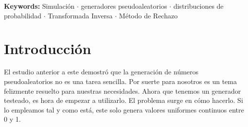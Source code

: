 \documentclass[a4paper, 11pt]{article}
\begin{document}
\newpage
\thispagestyle{empty}
\tableofcontents
\newpage
{}

\begin{abstract}
\noindent
El presente trabajo tiene por objetivo construir generadores de números pseudoaleatorios
para nueve distribuciones de probabilidad —cuatro continuas y cinco discretas— a partir
del generador uniforme $\mathcal{U}(0,1)$ ya validado en el trabajo anterior (Generador
Congruencial Lineal con parámetros ANSI C). Para cada distribución se estudia la teoría
subyacente, se deriva matemáticamente la Transformada Inversa y, cuando corresponde,
el Método de Rechazo. Se implementan en Python 3.x los generadores de la distribución
Uniforme y Normal; el resto se describe algorítmicamente. La correcta generación de
valores se valida mediante tests estadísticos Chi-cuadrado y Kolmogorov-Smirnov, con
$N=1000$ muestras y $\alpha = 0{,}05$, usando tres semillas distintas. Los 18 ensayos
de testeo requeridos por la cátedra aprueban sin excepción, confirmando que los
algoritmos basados en \cite{naylor1982} producen muestras estadísticamente indistinguibles
de las distribuciones teóricas de referencia.
\end{abstract}
\vspace{0.5cm}
\noindent\textbf{Keywords:} Simulación $\cdot$ generadores pseudoaleatorios $\cdot$
distribuciones de probabilidad $\cdot$ Transformada Inversa $\cdot$ Método de Rechazo

\newpage

\section{Introducción}

El estudio anterior a este demostró que la generación de números pseudoaleatorios no es
una tarea sencilla. Por suerte para nosotros es un tema felizmente resuelto para nuestras
necesidades. Ahora que tenemos un generador testeado, es hora de empezar a utilizarlo. El
problema surge en cómo hacerlo. Si lo empleamos tal y como está, este solo genera valores
uniformes continuos entre 0 y 1.
\end{document}
